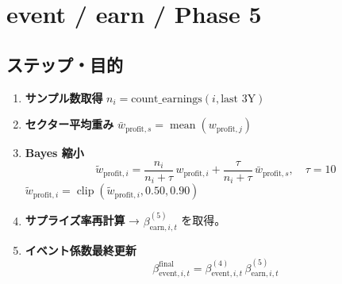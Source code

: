 
\section*{event / earn / Phase 5}\nopagebreak[4]
\subsection*{ステップ・目的}
\begin{flushleft}
\begin{enumerate}
  \item \textbf{サンプル数取得}\;
        \( n_i=\text{count\_earnings}(i,\text{last 3Y}) \)

  \item \textbf{セクター平均重み}\;
        \( \bar w_{\text{profit},s}=\operatorname{mean}(w_{\text{profit},j}) \)

  \item \textbf{Bayes 縮小}\;
        \[
          \tilde w_{\text{profit},i}
            =\frac{n_i}{n_i+\tau}\,w_{\text{profit},i}
             +\frac{\tau}{n_i+\tau}\,\bar w_{\text{profit},s},
          \quad \tau = 10
        \]
        \( \tilde w_{\text{profit},i}=\operatorname{clip}(\tilde w_{\text{profit},i},0.50,0.90) \)

  \item \textbf{サプライズ率再計算} → $\beta_{\text{earn},i,t}^{(5)}$ を取得。

  \item \textbf{イベント係数最終更新}\;
        \[
          \beta_{\text{event},i,t}^{\text{final}}
            =\beta_{\text{event},i,t}^{(4)}\,
             \beta_{\text{earn},i,t}^{(5)}
        \]
\end{enumerate}
\end{flushleft}

